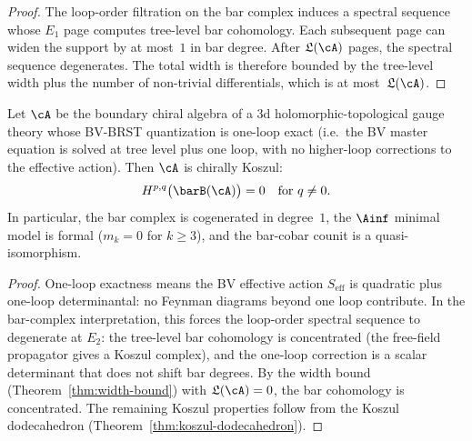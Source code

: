 \begin{proof}
The loop-order filtration on the bar complex induces
a spectral sequence whose $E_1$ page computes tree-level
bar cohomology. Each subsequent page can widen the support
by at most~$1$ in bar degree. After $\mathfrak{L}(\cA)$
pages, the spectral sequence degenerates. The total width
is therefore bounded by the tree-level width plus the number
of non-trivial differentials, which is at
most~$\mathfrak{L}(\cA)$.
\end{proof}

\begin{theorem}
\label{thm:one-loop-koszul}
Let\/ $\cA$ be the boundary chiral algebra of a 3d
holomorphic-topological gauge theory whose BV-BRST
quantization is one-loop exact \textup{(}i.e.\ the
BV master equation is solved at tree level plus one loop,
with no higher-loop corrections to the effective action\textup{)}.
Then $\cA$ is chirally Koszul:
\[
H^{p,q}\bigl(\barB(\cA)\bigr) = 0 \quad \text{for } q \neq 0.
\]
In particular, the bar complex is cogenerated in degree~$1$,
the $\Ainf$ minimal model is formal \textup{(}$m_k = 0$
for $k \ge 3$\textup{)}, and the bar-cobar counit is a
quasi-isomorphism.
\end{theorem}

\begin{proof}
One-loop exactness means the BV effective action $S_{\mathrm{eff}}$
is quadratic plus one-loop determinantal: no Feynman diagrams
beyond one loop contribute. In the bar-complex interpretation,
this forces the loop-order spectral sequence to degenerate at
$E_2$: the tree-level bar cohomology is concentrated (the
free-field propagator gives a Koszul complex), and the one-loop
correction is a scalar determinant that does not shift bar
degrees. By the width bound (Theorem~\ref{thm:width-bound})
with $\mathfrak{L}(\cA) = 0$, the bar cohomology is
concentrated. The remaining Koszul properties follow from the
Koszul dodecahedron (Theorem~\ref{thm:koszul-dodecahedron}).
\end{proof}

